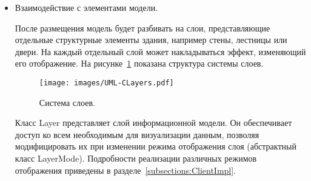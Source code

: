 \begin{itemize}
{        Для корректного размещения модели используется класс Stand,
        отвечающий за расчет размеров модели. Размещаемая модель должна
        полностью использовать поверхность виртуального стола,
        не выходя за его пределы. После размещения модели пользователь приложения
        имеет возможность изменять свой размер в виртуальном пространстве,
        чтобы соответствовать размерам модели.
        Для этого используется класс UserScaler, позволяющий изменять размер
        пользователя через передачу числового параметра от 0 до 1,
        где 0 соответствует масштабу информационной модели,
        а 1 -- изначальному размеру пользователя в виртуальной среде.
        Подробности реализации описаны в разделе~\ref{subsections:ClientImpl}.
    } 
    \item {
        Взаимодействие с элементами модели.

        После размещения модель будет разбивать на слои,
        представляющие отдельные структурные элементы здания,
        например стены, лестницы или двери.
        На каждый отдельный слой может накладываться эффект,
        изменяющий его отображение.
        На рисунке~\ref{figure:CLayers} показана
        структура системы слоев.

        \begin{figure}[ht]
            \centering
            \texttt{[image: images/UML-CLayers.pdf]}
            \caption{Система слоев.}
            \label{figure:CLayers}
        \end{figure}

        Класс Layer представляет слой информационной модели.
        Он обеспечивает доступ ко всем необходимым для визуализации данным,
        позволяя модифицировать их при изменении режима отображения слоя
        (абстрактный класс LayerMode).
        Подробности реализации различных режимов отображения
        приведены в разделе~\ref{subsections:ClientImpl}.
    } 
\end{itemize}
